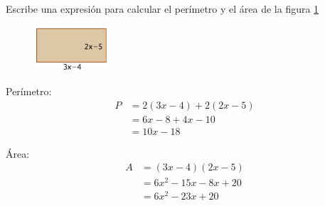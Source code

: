 Escribe una expresión para calcular el perímetro y el área de la figura \ref{fig:20230319044552}

\begin{figure}[H]
    \centering
    \includegraphics[width=0.25\textwidth]{../images/20230319044552}
    \caption{}
    \label{fig:20230319044552}
\end{figure}

\begin{solutionbox}{3.5cm}
    \begin{multicols}{2}
      Perímetro:
      \begin{align*}
        P & =2(3x-4)+2(2x-5) \\
          & =6x-8+4x-10      \\
          & =10x-18
      \end{align*}
    
      Área:
      \begin{align*}
        A & =(3x-4)(2x-5)     \\
          & =6x^2-15x-8x+20  \\
          & =6x^2-23x+20
      \end{align*}
    \end{multicols}
  \end{solutionbox}
